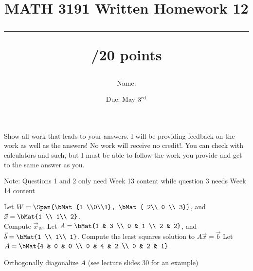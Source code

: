 \documentclass{exam}
\title{MATH 3191 Written Homework 12\\\rule{30pt}{1pt}/20 points}
\author{Name: \rule{150pt}{1pt}}
\date{Due: May $3^\textnormal{rd}$}
\begin{document}
\maketitle
Show all work that leads to your answers. I will be providing feedback on the work as well as the answers!
No work will receive no credit!. You can check with calculators and such, but I must be able to follow the work you provide and get to the same answer as you.

Note: Questions 1 and 2 only need Week 13 content while question 3 needs Week 14 content
\begin{questions}
    \question[5] Let $W = \Span{\bMat{1 \\0\\1}, \bMat{ 2\\ 0 \\ 3}}$, and $\vec{x} = \bMat{1 \\ 1\\ 2}$.
        \\Compute $\vec{x}_W$.
        \vfill
    \question[5] Let $A = \bMat{1 & 3 \\ 0 & 1 \\ 2 & 2}$, and $\vec{b} = \bMat{1 \\ 1\\ 1}$.
        Compute the least squares solution to $A\vec{x} = \vec{b}$
        \vfill
    \newpage
    \question[10] Let $A = \bMat{4 & 0 & 0 \\ 0 & 4 & 2 \\ 0 & 2 & 1}$

    Orthogonally diagonalize $A$ (see lecture slides 30 for an example)
\end{questions}
\end{document}

